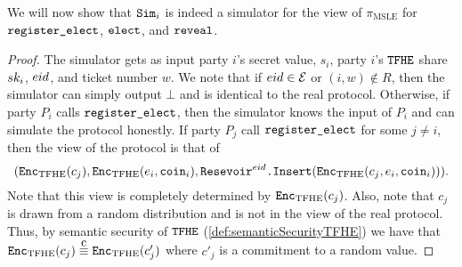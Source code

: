 We will now show that $\texttt{Sim}_i$ is indeed a simulator for the view of $\pi_{\text{MSLE}}$
for $\texttt{register\_elect}$, $\texttt{elect}$, and $\texttt{reveal}$.

\begin{lemma}
	\label{lemma:regElectSemiHonest}
	\begin{proof}
		The simulator gets as input party $i$'s secret value, $s_i$, party $i$'s ${\texttt{TFHE}}$ share $sk_i$,
		${eid}$, and ticket number $w$. We note that if ${eid} \in \mathcal{E}$ or $(i, w) \notin R$, then the simulator can simply output $\bot$ and
		is identical to the real protocol.
		Otherwise, if party $P_i$ calls $\texttt{register\_elect}$, then the simulator knows the input of $P_i$ and can simulate the protocol
		honestly. If party $P_j$ call $\texttt{register\_elect}$ for some $j \neq i$, then the view of the protocol
		is that of $$(\texttt{Enc}_{\mathrm{TFHE}}(c_j), \texttt{Enc}_{\mathrm{TFHE}}(e_i, \texttt{coin}_i), \texttt{Resevoir}^{{eid}}\texttt{.Insert}(\texttt{Enc}_{\mathrm{TFHE}}(c_j, e_i, \texttt{coin}_i))).$$
		Note that this view is completely determined by $\texttt{Enc}_{\mathrm{TFHE}}(c_j)$. Also, note that $c_j$ is drawn
		from a random distribution and is not in the view of the real protocol. Thus,
		by semantic security of ${\texttt{TFHE}}$ (\cref{def:semanticSecurityTFHE}) we have that
		$\Enc(c_j) \compInd \Enc(c'_j)$ where $c'_j$ is a commitment to a random value.
	\end{proof}
\end{lemma}

